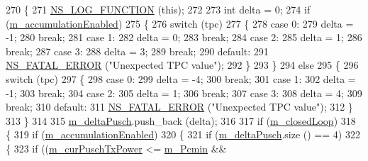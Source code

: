 \begin{DoxyCode}
270 \{
271   \hyperlink{log-macros-disabled_8h_a90b90d5bad1f39cb1b64923ea94c0761}{NS\_LOG\_FUNCTION} (\textcolor{keyword}{this});
272 
273   \textcolor{keywordtype}{int} delta = 0;
274   \textcolor{keywordflow}{if} (\hyperlink{classns3_1_1LteUePowerControl_afb48a41c71eee57f8e624420aad0d073}{m\_accumulationEnabled})
275     \{
276       \textcolor{keywordflow}{switch} (tpc)
277         \{
278         \textcolor{keywordflow}{case} 0:
279           delta = -1;
280           \textcolor{keywordflow}{break};
281         \textcolor{keywordflow}{case} 1:
282           delta = 0;
283           \textcolor{keywordflow}{break};
284         \textcolor{keywordflow}{case} 2:
285           delta = 1;
286           \textcolor{keywordflow}{break};
287         \textcolor{keywordflow}{case} 3:
288           delta = 3;
289           \textcolor{keywordflow}{break};
290         \textcolor{keywordflow}{default}:
291           \hyperlink{group__fatal_ga5131d5e3f75d7d4cbfd706ac456fdc85}{NS\_FATAL\_ERROR} (\textcolor{stringliteral}{"Unexpected TPC value"});
292         \}
293     \}
294   \textcolor{keywordflow}{else}
295     \{
296       \textcolor{keywordflow}{switch} (tpc)
297         \{
298         \textcolor{keywordflow}{case} 0:
299           delta = -4;
300           \textcolor{keywordflow}{break};
301         \textcolor{keywordflow}{case} 1:
302           delta = -1;
303           \textcolor{keywordflow}{break};
304         \textcolor{keywordflow}{case} 2:
305           delta = 1;
306           \textcolor{keywordflow}{break};
307         \textcolor{keywordflow}{case} 3:
308           delta = 4;
309           \textcolor{keywordflow}{break};
310         \textcolor{keywordflow}{default}:
311           \hyperlink{group__fatal_ga5131d5e3f75d7d4cbfd706ac456fdc85}{NS\_FATAL\_ERROR} (\textcolor{stringliteral}{"Unexpected TPC value"});
312         \}
313     \}
314 
315   \hyperlink{classns3_1_1LteUePowerControl_aaa037e0d62eb579bf3c8fbc5f6b8bbe7}{m\_deltaPusch}.push\_back (delta);
316 
317   \textcolor{keywordflow}{if} (\hyperlink{classns3_1_1LteUePowerControl_a0bb35bbebbdd20c4c6140b984332367b}{m\_closedLoop})
318     \{
319       \textcolor{keywordflow}{if} (\hyperlink{classns3_1_1LteUePowerControl_afb48a41c71eee57f8e624420aad0d073}{m\_accumulationEnabled})
320         \{
321           \textcolor{keywordflow}{if} (\hyperlink{classns3_1_1LteUePowerControl_aaa037e0d62eb579bf3c8fbc5f6b8bbe7}{m\_deltaPusch}.size () == 4)
322             \{
323               \textcolor{keywordflow}{if} ((\hyperlink{classns3_1_1LteUePowerControl_a9383c506998b50d2d344ee5c59241751}{m\_curPuschTxPower} <= \hyperlink{classns3_1_1LteUePowerControl_ae0cff8633e8442bf356f409f303d5003}{m\_Pcmin} && 

\end{DoxyCode}
